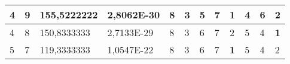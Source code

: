 \documentclass[conference]{IEEEtran}
\begin{document}
\begin{table*}[]
\begin{tabular}{|llll|llllllll|}
\multicolumn{1}{|l|}{4}                                                              & \multicolumn{1}{l|}{9}                                                                 & \multicolumn{1}{l|}{155,5222222}                                                           & 2,8062E-30                              & \multicolumn{1}{l|}{8}                                                           & \multicolumn{1}{l|}{3}                                                           & \multicolumn{1}{l|}{5}                                                           & \multicolumn{1}{l|}{7}                                                           & \multicolumn{1}{l|}{\textbf{1}}                                                  & \multicolumn{1}{l|}{4}                                                           & \multicolumn{1}{l|}{6}                                                           & 2                                   \\ \hline
\multicolumn{1}{|l|}{4}                                                              & \multicolumn{1}{l|}{8}                                                                 & \multicolumn{1}{l|}{150,8333333}                                                           & 2,7133E-29                              & \multicolumn{1}{l|}{8}                                                           & \multicolumn{1}{l|}{3}                                                           & \multicolumn{1}{l|}{6}                                                           & \multicolumn{1}{l|}{7}                                                           & \multicolumn{1}{l|}{2}                                                           & \multicolumn{1}{l|}{5}                                                           & \multicolumn{1}{l|}{4}                                                           & \textbf{1}                          \\ \hline
\multicolumn{1}{|l|}{5}                                                              & \multicolumn{1}{l|}{7}                                                                 & \multicolumn{1}{l|}{119,3333333}                                                           & 1,0547E-22                              & \multicolumn{1}{l|}{8}                                                           & \multicolumn{1}{l|}{3}                                                           & \multicolumn{1}{l|}{6}                                                           & \multicolumn{1}{l|}{7}                                                           & \multicolumn{1}{l|}{\textbf{1}}                                                  & \multicolumn{1}{l|}{5}                                                           & \multicolumn{1}{l|}{4}                                                           & 2                                   \\ \hline

\end{tabular}
\end{table*}
\end{document}
